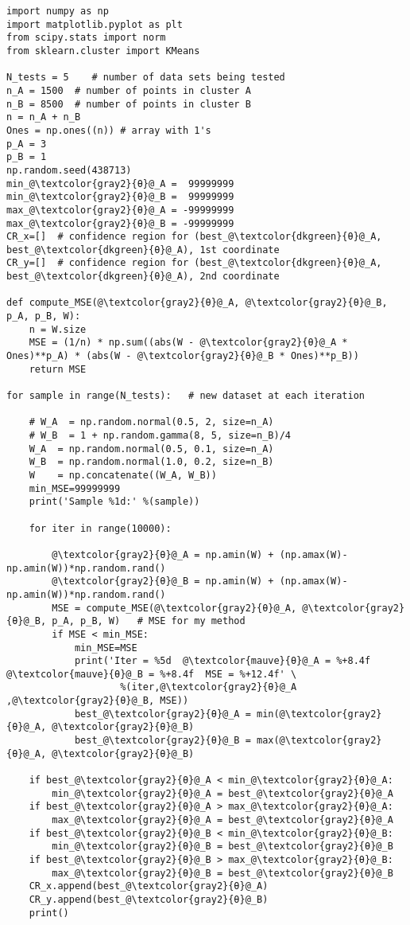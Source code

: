 \documentclass[oneside,10pt]{book}
\begin{document}
\begin{lstlisting}[escapechar=@]
import numpy as np
import matplotlib.pyplot as plt
from scipy.stats import norm 
from sklearn.cluster import KMeans

N_tests = 5    # number of data sets being tested
n_A = 1500  # number of points in cluster A
n_B = 8500  # number of points in cluster B
n = n_A + n_B
Ones = np.ones((n)) # array with 1's
p_A = 3
p_B = 1
np.random.seed(438713)
min_@\textcolor{gray2}{θ}@_A =  99999999
min_@\textcolor{gray2}{θ}@_B =  99999999
max_@\textcolor{gray2}{θ}@_A = -99999999
max_@\textcolor{gray2}{θ}@_B = -99999999
CR_x=[]  # confidence region for (best_@\textcolor{dkgreen}{θ}@_A, best_@\textcolor{dkgreen}{θ}@_A), 1st coordinate  
CR_y=[]  # confidence region for (best_@\textcolor{dkgreen}{θ}@_A, best_@\textcolor{dkgreen}{θ}@_A), 2nd coordinate 

def compute_MSE(@\textcolor{gray2}{θ}@_A, @\textcolor{gray2}{θ}@_B, p_A, p_B, W):
    n = W.size
    MSE = (1/n) * np.sum((abs(W - @\textcolor{gray2}{θ}@_A * Ones)**p_A) * (abs(W - @\textcolor{gray2}{θ}@_B * Ones)**p_B))
    return MSE

for sample in range(N_tests):   # new dataset at each iteration

    # W_A  = np.random.normal(0.5, 2, size=n_A)
    # W_B  = 1 + np.random.gamma(8, 5, size=n_B)/4
    W_A  = np.random.normal(0.5, 0.1, size=n_A)
    W_B  = np.random.normal(1.0, 0.2, size=n_B)
    W    = np.concatenate((W_A, W_B))
    min_MSE=99999999
    print('Sample %1d:' %(sample))

    for iter in range(10000):

        @\textcolor{gray2}{θ}@_A = np.amin(W) + (np.amax(W)-np.amin(W))*np.random.rand()
        @\textcolor{gray2}{θ}@_B = np.amin(W) + (np.amax(W)-np.amin(W))*np.random.rand()
        MSE = compute_MSE(@\textcolor{gray2}{θ}@_A, @\textcolor{gray2}{θ}@_B, p_A, p_B, W)   # MSE for my method
        if MSE < min_MSE:
            min_MSE=MSE
            print('Iter = %5d  @\textcolor{mauve}{θ}@_A = %+8.4f  @\textcolor{mauve}{θ}@_B = %+8.4f  MSE = %+12.4f' \
                    %(iter,@\textcolor{gray2}{θ}@_A ,@\textcolor{gray2}{θ}@_B, MSE))
            best_@\textcolor{gray2}{θ}@_A = min(@\textcolor{gray2}{θ}@_A, @\textcolor{gray2}{θ}@_B)
            best_@\textcolor{gray2}{θ}@_B = max(@\textcolor{gray2}{θ}@_A, @\textcolor{gray2}{θ}@_B)

    if best_@\textcolor{gray2}{θ}@_A < min_@\textcolor{gray2}{θ}@_A:
        min_@\textcolor{gray2}{θ}@_A = best_@\textcolor{gray2}{θ}@_A
    if best_@\textcolor{gray2}{θ}@_A > max_@\textcolor{gray2}{θ}@_A:
        max_@\textcolor{gray2}{θ}@_A = best_@\textcolor{gray2}{θ}@_A
    if best_@\textcolor{gray2}{θ}@_B < min_@\textcolor{gray2}{θ}@_B:
        min_@\textcolor{gray2}{θ}@_B = best_@\textcolor{gray2}{θ}@_B
    if best_@\textcolor{gray2}{θ}@_B > max_@\textcolor{gray2}{θ}@_B:
        max_@\textcolor{gray2}{θ}@_B = best_@\textcolor{gray2}{θ}@_B
    CR_x.append(best_@\textcolor{gray2}{θ}@_A) 
    CR_y.append(best_@\textcolor{gray2}{θ}@_B) 
    print()


\end{lstlisting}
\end{document}
